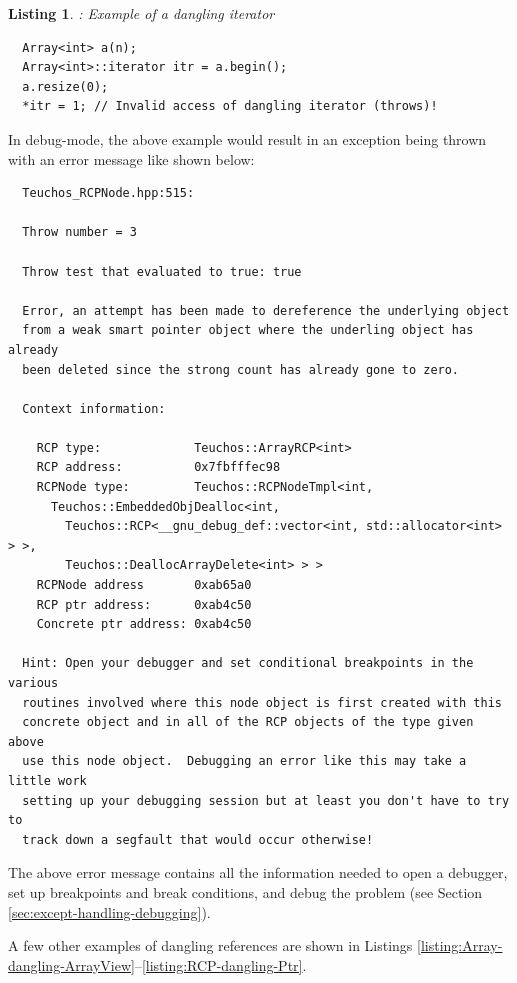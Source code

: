 \documentclass[pdf,ps2pdf,11pt]{SANDreport}
\newtheorem{listing}{Listing}
\begin{document}
\begin{listing}: Example of a dangling iterator \\
\label{listing:Array-dangling-iterator}
{\small\begin{verbatim}
  Array<int> a(n);
  Array<int>::iterator itr = a.begin();
  a.resize(0);
  *itr = 1; // Invalid access of dangling iterator (throws)!
\end{verbatim}}
\end{listing}

In debug-mode, the above example would result in an exception being
thrown with an error message like shown below:

{\small\begin{verbatim}
  Teuchos_RCPNode.hpp:515:
  
  Throw number = 3
  
  Throw test that evaluated to true: true
  
  Error, an attempt has been made to dereference the underlying object
  from a weak smart pointer object where the underling object has already
  been deleted since the strong count has already gone to zero.
  
  Context information:
  
    RCP type:             Teuchos::ArrayRCP<int>
    RCP address:          0x7fbfffec98
    RCPNode type:         Teuchos::RCPNodeTmpl<int,
      Teuchos::EmbeddedObjDealloc<int,
        Teuchos::RCP<__gnu_debug_def::vector<int, std::allocator<int> > >,
        Teuchos::DeallocArrayDelete<int> > >
    RCPNode address       0xab65a0
    RCP ptr address:      0xab4c50
    Concrete ptr address: 0xab4c50
  
  Hint: Open your debugger and set conditional breakpoints in the various
  routines involved where this node object is first created with this
  concrete object and in all of the RCP objects of the type given above
  use this node object.  Debugging an error like this may take a little work
  setting up your debugging session but at least you don't have to try to
  track down a segfault that would occur otherwise!
\end{verbatim}}

The above error message contains all the information needed to open a
debugger, set up breakpoints and break conditions, and debug the
problem (see Section {}\ref{sec:except-handling-debugging}).

A few other examples of dangling references are shown in Listings
{}\ref{listing:Array-dangling-ArrayView}--{}\ref{listing:RCP-dangling-Ptr}.
\end{document}
